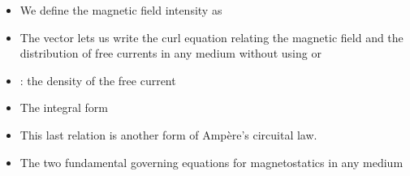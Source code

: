 \begin{ELjoin}

\begin{itemize}
\tightlist
\item
  We define the magnetic field intensity as
\end{itemize}

\begin{ELimportant}{}


\end{ELimportant}

\end{ELjoin}

\begin{ELjoin}

\begin{itemize}
\tightlist
\item
  The vector  lets us write the curl equation relating the magnetic field and the distribution of free currents in any medium without using  or 
\end{itemize}

\begin{ELimportant}{}


\end{ELimportant}

\end{ELjoin}

\begin{ELjoin}

\begin{itemize}
\tightlist
\item
  : the density of the free current
\item
  The integral form
\end{itemize}


\begin{itemize}
\tightlist
\item
  This last relation is another form of Ampère's circuital law.
\item
  The two fundamental governing equations for magnetostatics in any medium
\end{itemize}

\begin{ELimportant}{}


\end{ELimportant}

\end{ELjoin}

